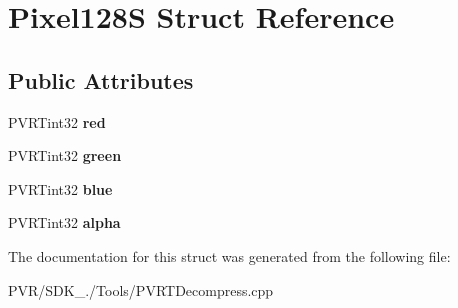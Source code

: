 \hypertarget{struct_pixel128_s}{\section{Pixel128\+S Struct Reference}
\label{struct_pixel128_s}
}
\subsection*{Public Attributes}
\begin{DoxyCompactItemize}
\item 
\hypertarget{struct_pixel128_s_ac03a79889a151843c73f62f18cccaf8f}{P\+V\+R\+Tint32 {\bfseries red}}\label{struct_pixel128_s_ac03a79889a151843c73f62f18cccaf8f}

\item 
\hypertarget{struct_pixel128_s_af598b2e73e7bed21ad07d5dad0e4a4e7}{P\+V\+R\+Tint32 {\bfseries green}}\label{struct_pixel128_s_af598b2e73e7bed21ad07d5dad0e4a4e7}

\item 
\hypertarget{struct_pixel128_s_a407daaa0bcd79552ccaa9b0ed5e19863}{P\+V\+R\+Tint32 {\bfseries blue}}\label{struct_pixel128_s_a407daaa0bcd79552ccaa9b0ed5e19863}

\item 
\hypertarget{struct_pixel128_s_ab19f6808252d6c4fa3e6813763d69c1e}{P\+V\+R\+Tint32 {\bfseries alpha}}\label{struct_pixel128_s_ab19f6808252d6c4fa3e6813763d69c1e}

\end{DoxyCompactItemize}


The documentation for this struct was generated from the following file\+:\begin{DoxyCompactItemize}
\item 
P\+V\+R/\+S\+D\+K\+\_./\+Tools/P\+V\+R\+T\+Decompress.\+cpp\end{DoxyCompactItemize}
